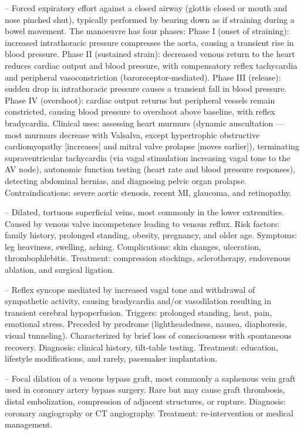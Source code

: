 -- Forced expiratory effort against a closed airway (glottis closed or mouth and nose pinched shut), typically performed by bearing down as if straining during a bowel movement. The manoeuvre has four phases: Phase I (onset of straining): increased intrathoracic pressure compresses the aorta, causing a transient rise in blood pressure. Phase II (sustained strain): decreased venous return to the heart reduces cardiac output and blood pressure, with compensatory reflex tachycardia and peripheral vasoconstriction (baroreceptor-mediated). Phase III (release): sudden drop in intrathoracic pressure causes a transient fall in blood pressure. Phase IV (overshoot): cardiac output returns but peripheral vessels remain constricted, causing blood pressure to overshoot above baseline, with reflex bradycardia. Clinical uses: assessing heart murmurs (dynamic auscultation — most murmurs decrease with Valsalva, except hypertrophic obstructive cardiomyopathy [increases] and mitral valve prolapse [moves earlier]), terminating supraventricular tachycardia (via vagal stimulation increasing vagal tone to the AV node), autonomic function testing (heart rate and blood pressure responses), detecting abdominal hernias, and diagnosing pelvic organ prolapse. Contraindications: severe aortic stenosis, recent MI, glaucoma, and retinopathy.

-- Dilated, tortuous superficial veins, most commonly in the lower extremities. Caused by venous valve incompetence leading to venous reflux. Risk factors: family history, prolonged standing, obesity, pregnancy, and older age. Symptoms: leg heaviness, swelling, aching. Complications: skin changes, ulceration, thrombophlebitis. Treatment: compression stockings, sclerotherapy, endovenous ablation, and surgical ligation.

-- Reflex syncope mediated by increased vagal tone and withdrawal of sympathetic activity, causing bradycardia and/or vasodilation resulting in transient cerebral hypoperfusion. Triggers: prolonged standing, heat, pain, emotional stress. Preceded by prodrome (lightheadedness, nausea, diaphoresis, visual tunneling). Characterized by brief loss of consciousness with spontaneous recovery. Diagnosis: clinical history, tilt-table testing. Treatment: education, lifestyle modifications, and rarely, pacemaker implantation.

-- Focal dilation of a venous bypass graft, most commonly a saphenous vein graft used in coronary artery bypass surgery. Rare but may cause graft thrombosis, distal embolization, compression of adjacent structures, or rupture. Diagnosis: coronary angiography or CT angiography. Treatment: re-intervention or medical management.


